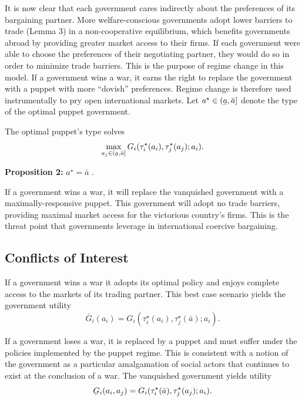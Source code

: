 \documentclass{puthesis}
\DeclareRobustCommand{\ubar}[1]{\underaccent{\bar}{#1}}
\begin{document}
It is now clear that each government cares indirectly about the
preferences of its bargaining partner. More welfare-conscious
governments adopt lower barriers to trade (Lemma 3) in a non-cooperative
equilibrium, which benefits governments abroad by providing greater
market access to their firms. If each government were able to choose the
preferences of their negotiating partner, they would do so in order to
minimize trade barriers. This is the purpose of regime change in this
model. If a government wins a war, it earns the right to replace the
government with a puppet with more ``dovish'' preferences. Regime change
is therefore used instrumentally to pry open international markets. Let
\(a^\star \in (\ubar{a}, \bar{a}]\) denote the type of the optimal
puppet government.

The optimal puppet's type solves \[
\max_{a_j \in (\ubar{a}, \bar{a}]} G_i( \tau_i^\star(a_i), \tau_j^\star(a_j); a_i ) .
\]

\textbf{Proposition 2:} \(a^\star = \bar{a}\) .

If a government wins a war, it will replace the vanquished government
with a maximally-responsive puppet. This government will adopt no trade
barriers, providing maximal market access for the victorious country's
firms. This is the threat point that governments leverage in
international coercive bargaining.

\subsection{Conflicts of Interest}

If a government wins a war it adopts its optimal policy and enjoys
complete access to the markets of its trading partner. This best case
scenario yields the government utility \begin{equation*} \label{eq:Gbar}
\bar{G}_i(a_i) = G_i(\tau_i^\star(a_i), \tau_j^\star(\bar{a}); a_i) .
\end{equation*}

If a government loses a war, it is replaced by a puppet and must suffer
under the policies implemented by the puppet regime. This is consistent
with a notion of the government as a particular amalgamation of social
actors that continues to exist at the conclusion of a war. The
vanquished government yields utility \begin{equation*} \label{eq:Gubar}
\ubar{G}_i(a_i, a_j) = G_i(\tau_i^\star(\bar{a}), \tau_j^\star(a_j); a_i) .
\end{equation*}
\end{document}
